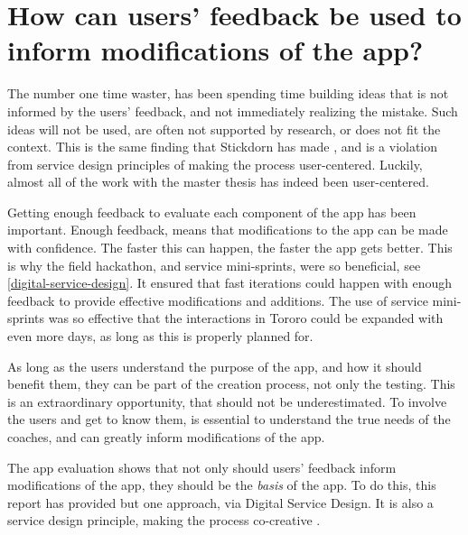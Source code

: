 
\section{How can users' feedback be used to inform modifications of the app?}


  The number one time waster, has been spending time building ideas that is not informed by the users' feedback, and not immediately realizing the mistake. Such ideas will not be used, are often not supported by research, or does not fit the context. This is the same finding that Stickdorn has made \cite{stickdorn}, and is a violation from service design principles of making the process user-centered. Luckily, almost all of the work with the master thesis has indeed been user-centered.

  Getting enough feedback to evaluate each component of the app has been important. Enough feedback, means that modifications to the app can be made with confidence. The faster this can happen, the faster the app gets better. This is why the field hackathon, and service mini-sprints, were so beneficial, see \ref{digital-service-design}. It ensured that fast iterations could happen with enough feedback to provide effective modifications and additions. The use of service mini-sprints was so effective that the interactions in Tororo could be expanded with even more days, as long as this is properly planned for.

  As long as the users understand the purpose of the app, and how it should benefit them, they can be part of the creation process, not only the testing. This is an extraordinary opportunity, that should not be underestimated. To involve the users and get to know them, is essential to understand the true needs of the coaches, and can greatly inform modifications of the app.

  The app evaluation shows that not only should users' feedback inform modifications of the app, they should be the \textit{basis} of the app. To do this, this report has provided but one approach, via Digital Service Design. It is also a service design principle, making the process co-creative \cite{stickdorn}.

